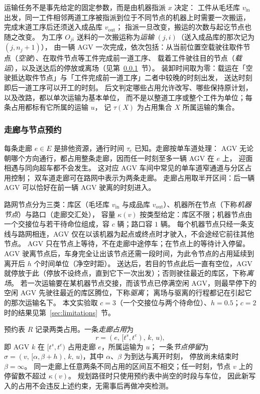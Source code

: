 \documentclass[manuscript,screen,review]{acmart}
\begin{document}
运输任务不是事先给定的固定参数，而是由机器指派 \(x\) 决定：
工件从毛坯库 \(v_{\mathrm{in}}\) 出发，同一工件相邻两道工序被指派到位于不同节点的机器上时需要一次搬运，
完成末道工序后还须送入成品库 \(v_{\mathrm{out}}\)；
指派一旦改变，搬运的次数与起讫节点也随之改变。
为工序 \(O_{ji}\) 送料的一次搬运称为\emph{运输} \((j,i)\)（送入成品库的那次记为 \((j,n_j+1)\)），
由一辆 AGV 一次完成，依次包括：从当前位置空载驶往取件节点（\emph{空驶}）、在取件节点等工件完成前一道工序、
载着工件驶往目的节点（\emph{载运}），以及送达后的停放或离场（见第~\ref{sec:reservation}~节）。
装卸时间取为零：载运在「空驶抵达取件节点」与「工件完成前一道工序」二者中较晚的时刻出发，
送达时刻即后一道工序可以开工的时刻。
后文判定哪些占用允许改写、哪些保持原计划，以及改路，都以单次运输为基本单位，
而不是以整道工序或整个工件为单位；每条占用都标有它所属的运输 \(u\)，
记 \(\tau(X)\) 为占用集合 \(X\) 所属运输的集合。

\subsubsection{走廊与节点预约}
\label{sec:reservation}

每条走廊 \(e\in E\) 是排他资源，通行时间 \(\tau_e\) 已知。走廊按单车道处理：
AGV 无论朝哪个方向通行，都占用整条走廊，因而任一时刻至多一辆 AGV 在 \(e\) 上，
迎面相遇与同向超车都不会发生。
这对应 AGV 车间中常见的单车道窄通道与分区占用控制；
双车道走廊可在路网中表示为两条走廊。
走廊占用取半开区间：后一辆 AGV 可以恰好在前一辆 AGV 驶离的时刻进入。

路网节点分为三类：库区（毛坯库 \(v_{\mathrm{in}}\) 与成品库 \(v_{\mathrm{out}}\)）、机器所在节点（下称\emph{机器节点}）与路口（走廊交汇处），
容量 \(\kappa(v)\) 按类型给定：库区不限；机器节点由一个交接位与若干待命位组成，容 \(c\) 辆；路口容 \(1\) 辆。
每个机器节点只经一条支线与路网相连，AGV 仅在以该机器为起点或终点时才驶入，不会途经它前往其他节点。
AGV 只在节点上等待，不在走廊中途停车；在节点上的等待计入停留。
AGV 驶离节点后，车身完全让出该节点还需一段时间，为此令节点的占用延续到离开后 \(h\) 个时间单位（净空时距）。
送达后，若目的节点此后一直有空位，AGV 就停放于此（停放不设终点，直到它下一次出发）；否则驶往最近的库区，下称\emph{离场}。
若一次运输要在某机器节点交接，而该节点已停满空闲 AGV，则最早停下的空闲 AGV 先驶往最近的库区腾位，下称\emph{驱离}；
离场与驱离的行程都记在引起它的那次运输名下。
本文实验取 \(c=3\)（一个交接位与两个待命位）、\(h=0.5\)；\(c=2\) 时的结果见第~\ref{sec:limitations}~节。

预约表 \(R\) 记录两类占用。一条\emph{走廊占用}为
\[
r=(e,\,[t^s,t^e),\,k,\,u),
\]
即 AGV \(k\) 在 \([t^s,t^e)\) 占用走廊 \(e\)，所属运输为 \(u\)；
一条\emph{节点停留}为 \(\sigma=(v,\,[\alpha,\beta+h),\,k,\,u)\)，其中 \(\alpha\)、\(\beta\) 为到达与离开时刻，
停放尚未结束时 \(\beta=\infty\)。
同一走廊上任意两条不同占用的区间互不相交；任一时刻，节点 \(v\) 上的停留数不超过 \(\kappa(v)\)。
规划路径时只使用预约表中尚空的时段与车位，
因此新写入的占用不会违反上述约束，无需事后再做冲突检测。
\end{document}
